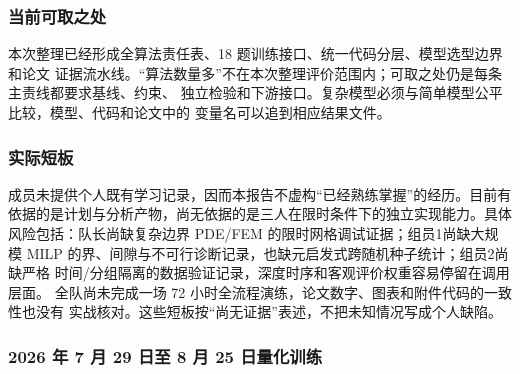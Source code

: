 \documentclass[UTF8,a4paper,12pt]{ctexart}
\begin{document}
\subsubsection{当前可取之处}

本次整理已经形成全算法责任表、18 题训练接口、统一代码分层、模型选型边界和论文
证据流水线。“算法数量多”不在本次整理评价范围内；可取之处仍是每条主责线都要求基线、约束、
独立检验和下游接口。复杂模型必须与简单模型公平比较，模型、代码和论文中的
变量名可以追到相应结果文件。

\subsubsection{实际短板}

成员未提供个人既有学习记录，因而本报告不虚构“已经熟练掌握”的经历。目前有
依据的是计划与分析产物，尚无依据的是三人在限时条件下的独立实现能力。具体
风险包括：队长尚缺复杂边界 PDE/FEM 的限时网格调试证据；组员1尚缺大规模
MILP 的界、间隙与不可行诊断记录，也缺元启发式跨随机种子统计；组员2尚缺严格
时间/分组隔离的数据验证记录，深度时序和客观评价权重容易停留在调用层面。
全队尚未完成一场 72 小时全流程演练，论文数字、图表和附件代码的一致性也没有
实战核对。这些短板按“尚无证据”表述，不把未知情况写成个人缺陷。

\subsubsection{2026 年 7 月 29 日至 8 月 25 日量化训练}
\end{document}
